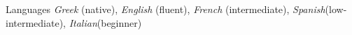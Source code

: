 \documentclass{resume}
\begin{document}




   







\begin{rSection}{Languages}
    \textit{Greek} (native), \textit{English} (fluent), \textit{French} (intermediate), \textit{Spanish}(low-intermediate), \textit{Italian}(beginner) \\
\end{rSection}
\end{document}
